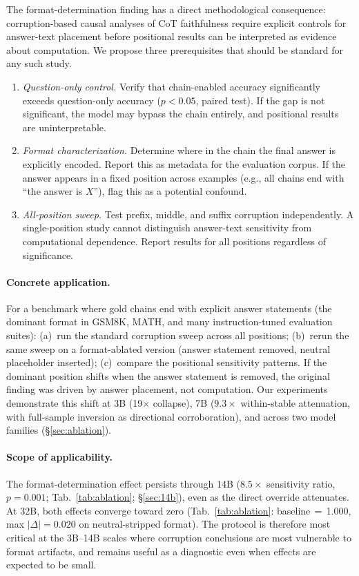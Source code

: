 \documentclass{article}
\theoremstyle{definition}
\theoremstyle{definition}
\begin{document}
The format-determination finding has a direct methodological consequence:
corruption-based causal analyses of CoT faithfulness require explicit
controls for answer-text placement before positional results can be
interpreted as evidence about computation. We propose three prerequisites
that should be standard for any such study.

\begin{enumerate}
  \item \emph{Question-only control.} Verify that chain-enabled accuracy
    significantly exceeds question-only accuracy ($p < 0.05$, paired test).
    If the gap is not significant, the model may bypass the chain entirely,
    and positional results are uninterpretable.
  \item \emph{Format characterization.} Determine where in the chain the
    final answer is explicitly encoded. Report this as metadata for the
    evaluation corpus. If the answer appears in a fixed position across
    examples (e.g., all chains end with ``the answer is $X$''), flag this as
    a potential confound.
  \item \emph{All-position sweep.} Test prefix, middle, and suffix
    corruption independently. A single-position study cannot distinguish
    answer-text sensitivity from computational dependence. Report results for
    all positions regardless of significance.
\end{enumerate}

\paragraph{Concrete application.}
For a benchmark where gold chains end with explicit answer statements (the
dominant format in GSM8K, MATH, and many instruction-tuned evaluation suites):
(a)~run the standard corruption sweep across all positions;
(b)~rerun the same sweep on a format-ablated version (answer statement
removed, neutral placeholder inserted);
(c)~compare the positional sensitivity patterns. If the dominant position
shifts when the answer statement is removed, the original finding was driven
by answer placement, not computation. Our experiments demonstrate this shift
at 3B (19$\times$ collapse), 7B ($9.3\times$ within-stable attenuation, with
full-sample inversion as directional corroboration), and across two model families
(\S\ref{sec:ablation}).

\paragraph{Scope of applicability.}
The format-determination effect persists through 14B ($8.5\times$ sensitivity
ratio, $p{=}0.001$; Tab.~\ref{tab:ablation}; \S\ref{sec:14b}), even as
the direct override attenuates. At 32B, both effects converge toward zero
(Tab.~\ref{tab:ablation}: baseline$\,=\,$1.000, max $|\Delta|{=}0.020$
on neutral-stripped format). The protocol is therefore most critical at the
3B--14B scales where corruption conclusions are most vulnerable
to format artifacts, and remains useful as a diagnostic even when effects
are expected to be small.
\end{document}
